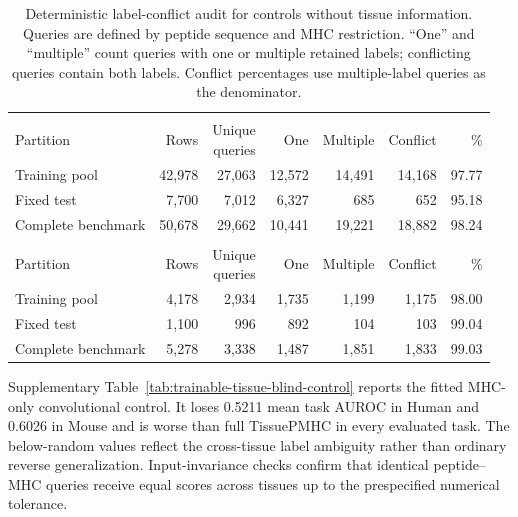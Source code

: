 \begin{table}[H]
\centering
\caption{Deterministic label-conflict audit for controls without tissue information. Queries are defined by peptide sequence and MHC restriction. ``One'' and ``multiple'' count queries with one or multiple retained labels; conflicting queries contain both labels. Conflict percentages use multiple-label queries as the denominator.}
\label{tab:tissue-blind-conflict-audit}
\fontsize{5.9}{6.8}\selectfont
\setlength{\tabcolsep}{1.7pt}
\renewcommand{\arraystretch}{1.05}
\begin{tabularx}{\columnwidth}{@{}>{\raggedright\arraybackslash}Xrrrrrr@{}}
\toprule
\multicolumn{7}{@{}l}{\textbf{Human benchmark}} \\
Partition & Rows & \shortstack{Unique\\queries} & One & Multiple & Conflict & \% \\
\midrule
Training pool & 42,978 & 27,063 & 12,572 & 14,491 & 14,168 & 97.77 \\
Fixed test & 7,700 & 7,012 & 6,327 & 685 & 652 & 95.18 \\
Complete benchmark & 50,678 & 29,662 & 10,441 & 19,221 & 18,882 & 98.24 \\
\midrule
\multicolumn{7}{@{}l}{\textbf{Mouse benchmark}} \\
Partition & Rows & \shortstack{Unique\\queries} & One & Multiple & Conflict & \% \\
\midrule
Training pool & 4,178 & 2,934 & 1,735 & 1,199 & 1,175 & 98.00 \\
Fixed test & 1,100 & 996 & 892 & 104 & 103 & 99.04 \\
Complete benchmark & 5,278 & 3,338 & 1,487 & 1,851 & 1,833 & 99.03 \\
\bottomrule
\end{tabularx}
\end{table}

Supplementary Table~\ref{tab:trainable-tissue-blind-control} reports the fitted MHC-only convolutional control. It loses 0.5211 mean task AUROC in Human and 0.6026 in Mouse and is worse than full TissuePMHC in every evaluated task. The below-random values reflect the cross-tissue label ambiguity rather than ordinary reverse generalization. Input-invariance checks confirm that identical peptide--MHC queries receive equal scores across tissues up to the prespecified numerical tolerance.

